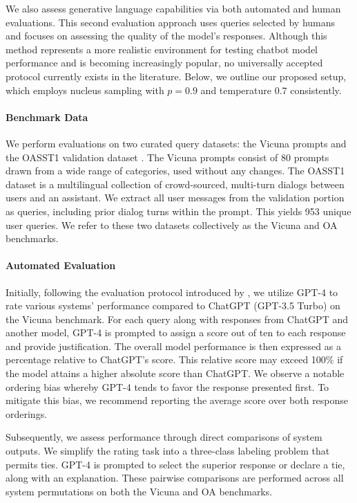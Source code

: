 We also assess generative language capabilities via both automated and human evaluations. This second evaluation approach uses queries selected by humans and focuses on assessing the quality of the model's responses. Although this method represents a more realistic environment for testing chatbot model performance and is becoming increasingly popular, no universally accepted protocol currently exists in the literature. Below, we outline our proposed setup, which employs nucleus sampling with $p=0.9$ and temperature $0.7$ consistently.

\paragraph{Benchmark Data} We perform evaluations on two curated query datasets: the Vicuna prompts \citep{vicuna2023} and the OASST1 validation dataset \citep{kopf2023openassistant}. The Vicuna prompts consist of 80 prompts drawn from a wide range of categories, used without any changes. The OASST1 dataset is a multilingual collection of crowd-sourced, multi-turn dialogs between users and an assistant. We extract all user messages from the validation portion as queries, including prior dialog turns within the prompt. This yields 953 unique user queries. We refer to these two datasets collectively as the Vicuna and OA benchmarks.

\paragraph{Automated Evaluation} Initially, following the evaluation protocol introduced by \citet{vicuna2023}, we utilize GPT-4 to rate various systems' performance compared to ChatGPT (GPT-3.5 Turbo) on the Vicuna benchmark. For each query along with responses from ChatGPT and another model, GPT-4 is prompted to assign a score out of ten to each response and provide justification. The overall model performance is then expressed as a percentage relative to ChatGPT’s score. This relative score may exceed 100\% if the model attains a higher absolute score than ChatGPT. We observe a notable ordering bias whereby GPT-4 tends to favor the response presented first. To mitigate this bias, we recommend reporting the average score over both response orderings.

Subsequently, we assess performance through direct comparisons of system outputs. We simplify the rating task into a three-class labeling problem that permits ties. GPT-4 is prompted to select the superior response or declare a tie, along with an explanation. These pairwise comparisons are performed across all system permutations on both the Vicuna and OA benchmarks.

